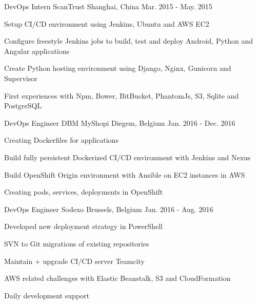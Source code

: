 

\begin{cventries}

  \cventry
    {DevOps Intern} %
    {ScanTrust} %
    {Shanghai, China} %
    {Mar. 2015 - May. 2015} %
    {
      \begin{cvitems} %
        \item {Setup CI/CD environment using Jenkins, Ubuntu and AWS EC2}
        \item {Configure freestyle Jenkins jobs to build, test and deploy Android, Python and Angular applications}
        \item {Create Python hosting environment using Django, Nginx, Gunicorn and Supervisor}        
        \item {First experiences with Npm, Bower, BitBucket, PhantomJs, S3, Sqlite and PostgreSQL}
      \end{cvitems}
    }

  \cventry
    {DevOps Engineer} %
    {DBM MyShopi} %
    {Diegem, Belgium} %
    {Jan. 2016 - Dec. 2016} %
    {
      \begin{cvitems} %
        \item {Creating Dockerfiles for applications}
        \item {Build fully persistent Dockerized CI/CD environment with Jenkins and Nexus}
        \item {Build OpenShift Origin environment with Ansible on EC2 instances in AWS}
        \item {Creating pods, services, deployments in OpenShift}
      \end{cvitems}
    }

  \cventry
    {DevOps Engineer} %
    {Sodexo} %
    {Brussels, Belgium} %
    {Jan. 2016 - Aug. 2016} %
    {
      \begin{cvitems} %
        \item {Developed new deployment strategy in PowerShell}
        \item {SVN to Git migrations of existing repositories}
        \item {Maintain + upgrade CI/CD server Teamcity}
        \item {AWS related challenges with Elastic Beanstalk, S3 and CloudFormation}
        \item {Daily development support}
      \end{cvitems}
    }


\end{cventries}
